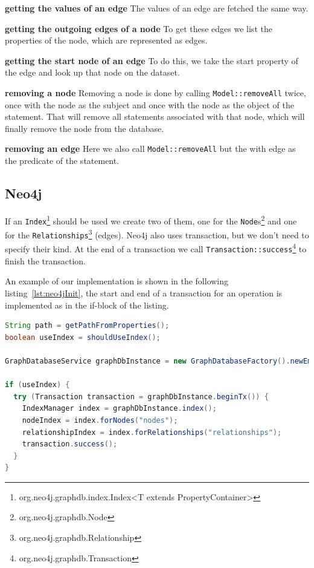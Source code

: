 \textbf{getting the values of an edge} \newline
The values of an edge are fetched the same way.

\textbf{getting the outgoing edges of a node} \newline
To get these edges we list the properties of the node,
which are represented as edges.

\textbf{getting the start node of an edge} \newline
To do this,
we take the start property of the edge and look up that node on the dataset.

\textbf{removing a node} \newline
Removing a node is done by calling \texttt{Model::removeAll} twice,
once with the node as the subject and once with the node as the object of the statement.
That will remove all statements associated with that node,
which will finally remove the node from the database.

\textbf{removing an edge} \newline
Here we also call \texttt{Model::removeAll} but the with edge as the predicate of the statement.

\subsection{Neo4j}
If an \texttt{Index}\footnote{org.neo4j.graphdb.index.Index<T extends PropertyContainer>} should be used we create two of them,
one for the \texttt{Node}s\footnote{org.neo4j.graphdb.Node} and one for the \texttt{Relationships}\footnote{org.neo4j.graphdb.Relationship} (edges).
Neo4j also uses transaction,
but we don't need to specify their kind.
At the end of a transaction we call \texttt{Transaction::success}\footnote{org.neo4j.graphdb.Transaction} to finish the transaction.

An example of our implementation is shown in the following listing~\ref{lst:neo4jInit}, the start and end of a transaction for an operation is implemented as in the if-block of the listing.

\begin{lstlisting}[language=Java,label={lst:neo4jInit},caption={Implementation of the initialisation and beginning of a transaction.},captionpos=b]
String path = getPathFromProperties();
boolean useIndex = shouldUseIndex();

GraphDatabaseService graphDbInstance = new GraphDatabaseFactory().newEmbeddedDatabase(new File(path));

if (useIndex) {
  try (Transaction transaction = graphDbInstance.beginTx()) {
    IndexManager index = graphDbInstance.index();
    nodeIndex = index.forNodes("nodes");
    relationshipIndex = index.forRelationships("relationships");
    transaction.success();
  }
}
\end{lstlisting}

